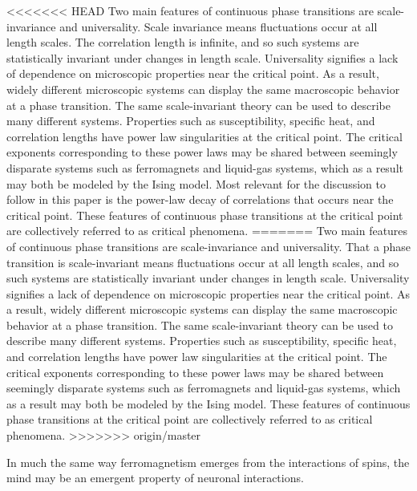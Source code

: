 \documentclass[12pt]{article}
\begin{document}
<<<<<<< HEAD
Two main features of continuous phase transitions are scale-invariance and universality. Scale invariance means fluctuations occur at all length scales. The correlation length is infinite, and so such systems are statistically invariant under changes in length scale. Universality signifies a lack of dependence on microscopic properties near the critical point. As a result, widely different microscopic systems can display the same macroscopic behavior at a phase transition. The same scale-invariant theory can be used to describe many different systems. Properties such as susceptibility, specific heat, and correlation lengths have power law singularities at the critical point. The critical exponents corresponding to these power laws  may be shared between seemingly disparate systems such as ferromagnets and liquid-gas systems, which as a result may both be modeled by the Ising model. Most relevant for the discussion to follow in this paper is the power-law decay of correlations that occurs near the critical point. These features of continuous phase transitions at the critical point are collectively referred to as critical phenomena.
=======
Two main features of continuous phase transitions are scale-invariance and universality. That a phase transition is scale-invariant means fluctuations occur at all length scales, and so such systems are statistically invariant under changes in length scale. Universality signifies a lack of dependence on microscopic properties near the critical point. As a result, widely different microscopic systems can display the same macroscopic behavior at a phase transition. The same scale-invariant theory can be used to describe many different systems. Properties such as susceptibility, specific heat, and correlation lengths have power law singularities at the critical point. The critical exponents corresponding to these power laws  may be shared between seemingly disparate systems such as ferromagnets and liquid-gas systems, which as a result may both be modeled by the Ising model. These features of continuous phase transitions at the critical point are collectively referred to as critical phenomena.
>>>>>>> origin/master

In much the same way ferromagnetism emerges from the interactions of spins, the mind may be an emergent property of neuronal interactions. 
\end{document}
